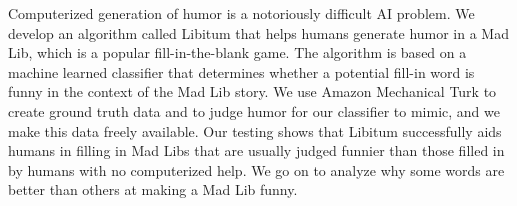 Computerized generation of humor is a notoriously difficult AI problem. We develop an algorithm called Libitum that helps humans generate humor in a Mad Lib, which is a popular fill-in-the-blank game. The algorithm is based on a machine learned classifier that determines whether a potential fill-in word is funny in the context of the Mad Lib story. We use Amazon Mechanical Turk to create ground truth data and to judge humor for our classifier to mimic, and we make this data freely available. Our testing shows that Libitum successfully aids humans in filling in Mad Libs that are usually judged funnier than those filled in by humans with no computerized help. We go on to analyze why some words are better than others at making a Mad Lib funny.
